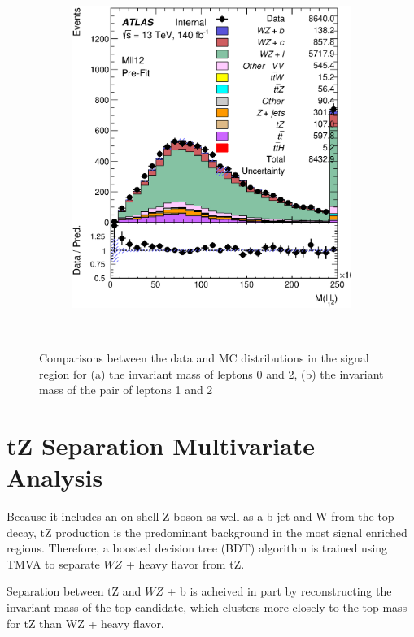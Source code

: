 \documentclass[NOTE, atlasdraft=true, texlive=2016, UKenglish]{\ATLASLATEXPATH atlasdoc}
\begin{document}
\begin{figure}[H]
\begin{subfigure}{.48\textwidth}
        \includegraphics[width=1\linewidth]{kinematics/Mll12.eps}
        \caption{}
        \label{fig:Mll12}
    \end{subfigure}\\
    \caption{Comparisons between the data and MC distributions in the signal region for (a) the invariant mass of leptons 0 and 2, (b) the invariant mass of the pair of leptons 1 and 2}
    \label{sr_kinematics}
\end{figure}


\section{tZ Separation Multivariate Analysis}
\label{sec:tZ_bdt}

Because it includes an on-shell Z boson as well as a b-jet and W from the top decay, tZ production is the predominant background in the most signal enriched regions. Therefore, a boosted decision tree (BDT) algorithm is trained using TMVA \cite{TMVA_guide} to separate $WZ$ + heavy flavor from tZ.

Separation between tZ and $WZ$ + b is acheived in part by reconstructing the invariant mass of the top candidate, which clusters more closely to the top mass for tZ than WZ + heavy flavor.
\end{document}
